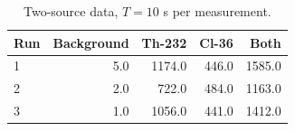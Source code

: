 \begin{table}[htbp]
\centering
\caption{Two-source data, $T = 10$ s per measurement.}
\label{tab:twosrc-raw}
\begin{tabular}{lrrrr}
\toprule
Run & Background & Th-232 & Cl-36 & Both \\
\midrule
1 & 5.0 & 1174.0 & 446.0 & 1585.0 \\
2 & 2.0 & 722.0 & 484.0 & 1163.0 \\
3 & 1.0 & 1056.0 & 441.0 & 1412.0 \\
\bottomrule
\end{tabular}
\end{table}
